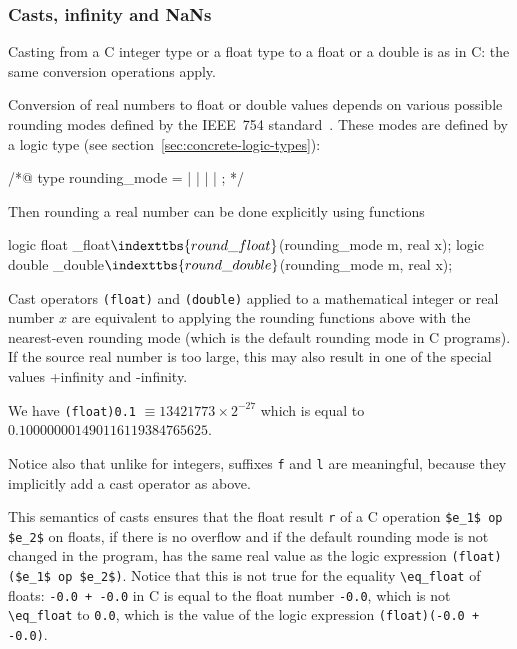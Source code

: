 \subsubsection{Casts, infinity and NaNs}

Casting from a C integer type or a float type to a float
or a double is as in C: the same conversion operations apply.

Conversion of real numbers to float or double values depends on
various possible rounding modes defined by the IEEE~754
standard~\cite{float-std,wikipedia-float}. These modes are defined by
a logic type (see section~\ref{sec:concrete-logic-types}):
\begin{listing-nonumber}
/*@ type rounding_mode = \Up | \Down | \ToZero | \NearestAway | \NearestEven;
*/
\end{listing-nonumber}
Then rounding a real number can be done explicitly using functions
\begin{listing-nonumber}
logic float \round_float$\indexttbs{round\_float}$(rounding_mode m, real x);
logic double \round_double$\indexttbs{round\_double}$(rounding_mode m, real x);
\end{listing-nonumber}
Cast operators \lstinline|(float)| and \lstinline|(double)| applied to a
mathematical integer or real number $x$ are equivalent to applying the
rounding functions above with the nearest-even rounding mode (which is
the default rounding mode in C programs).
If the source real number is too large, this may also result in one
of the special values +infinity and -infinity.
\begin{example}
  We have
  \lstinline|(float)0.1| $\equiv 13421773 \times 2 ^{-27}$ which is equal to
  $0.100000001490116119384765625$.
\end{example}
Notice also that unlike for integers, suffixes \lstinline|f| and
\lstinline|l| are
meaningful, because they implicitly add a cast operator as above.

This semantics of casts ensures that the float result \lstinline|r| of
a C operation \lstinline|$e_1$ op $e_2$| on floats, if there is no
overflow and if the default
rounding mode is not changed in the program, has the same real value
as the logic expression \lstinline|(float)($e_1$ op $e_2$)|. Notice
that this is not
true for the equality \lstinline|\eq_float| of floats: \lstinline|-0.0 + -0.0|
in C is equal to the float number \lstinline|-0.0|, which is not
\lstinline|\eq_float| to \lstinline|0.0|, which is the value of the logic
expression \lstinline|(float)(-0.0 + -0.0)|.

